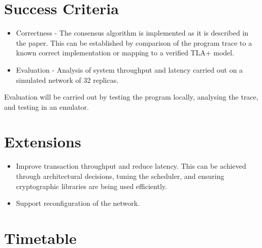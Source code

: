 \documentclass[a4paper]{article}
\begin{document}
\section{Success Criteria}
\begin{itemize}
	\item Correctness - The consensus algorithm is implemented as it is described in the paper. This can be established by comparison of the program trace to a known correct implementation or mapping to a verified TLA+ model.
	\item Evaluation - Analysis of system throughput and latency carried out on a simulated network of 32 replicas.
\end{itemize}
Evaluation will be carried out by testing the program locally, analysing the trace, and testing in an emulator.

\section{Extensions}
\begin{itemize}
	\item Improve transaction throughput and reduce latency. This can be achieved through architectural decisions, tuning the scheduler, and ensuring cryptographic libraries are being used efficiently.
	\item Support reconfiguration of the network.
\end{itemize}

\section{Timetable}
\end{document}
